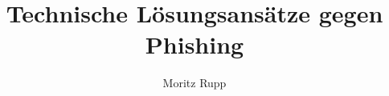 \documentclass[a4paper,10pt]{article}
\title{Technische Lösungsansätze gegen Phishing}
\author{Moritz Rupp}
\begin{document}
\maketitle

\begin{abstract}

\end{abstract}

\section{}
\end{document}
